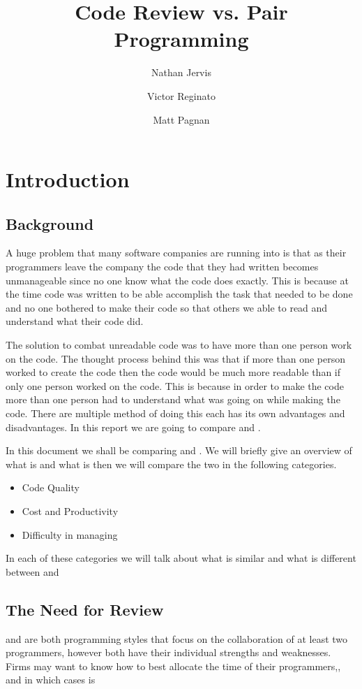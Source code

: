 \documentclass{article}
\title{Code Review vs. Pair Programming}
\author{Nathan Jervis \and Victor Reginato \and Matt Pagnan}
\begin{document}
\maketitle

\tableofcontents

\section{Introduction}

\subsection{Background}
A huge problem that many software companies are running into is that as their programmers leave the company the code that they had written becomes unmanageable since no one know what the code does exactly. This is because at the time code was written to be able accomplish the task that needed to be done and no one bothered to make their code so that others we able to read and understand what their code did.

The solution to combat unreadable code was to have more than one person work on the code. The thought process behind this was that if more than one person worked to create the code then the code would be much more readable than if only one person worked on the code. This is because in order to make the code more than one person had to understand what was going on while making the code. There are multiple method of doing this each has its own advantages and disadvantages. In this report we are going to compare \PP and \CR.

In this document we shall be comparing \PP and \CR. We will briefly give an overview of what \PP is and what \CR is then we will compare the two in the following categories.
\begin{itemize}
\item Code Quality
\item Cost and Productivity
\item Difficulty in managing
\end{itemize}

In each of these categories we will talk about what is similar and what is different between \PP and \CR \PR

\subsection{The Need for Review}
\PP and \CR are both programming styles that focus on the collaboration of at least two programmers, however both have their individual strengths and weaknesses. Firms may want to know how to best allocate the time of their programmers,, and in which cases \PP is 
\end{document}
